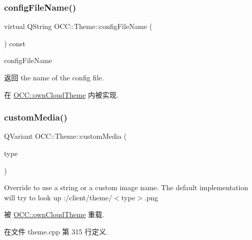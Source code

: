\subsubsection{\texorpdfstring{config\+File\+Name()}{configFileName()}}
{\footnotesize\ttfamily virtual Q\+String O\+C\+C\+::\+Theme\+::config\+File\+Name (\begin{DoxyParamCaption}{ }\end{DoxyParamCaption}) const\hspace{0.3cm}{\ttfamily [pure virtual]}}



config\+File\+Name 

\begin{DoxyReturn}{返回}
the name of the config file. 
\end{DoxyReturn}


在 \hyperlink{class_o_c_c_1_1own_cloud_theme_a83b4d95d9bc4fa972ad2e044720beac0}{O\+C\+C\+::own\+Cloud\+Theme} 内被实现.

\mbox{\label{class_o_c_c_1_1_theme_ac248812f511fad2b02d376b451bba2ec}} 
\subsubsection{\texorpdfstring{custom\+Media()}{customMedia()}}
{\footnotesize\ttfamily Q\+Variant O\+C\+C\+::\+Theme\+::custom\+Media (\begin{DoxyParamCaption}\item[{\hyperlink{class_o_c_c_1_1_theme_a7d36668d1fd0d715e4e1d8f4590d2d5d}{Custom\+Media\+Type}}]{type }\end{DoxyParamCaption})\hspace{0.3cm}{\ttfamily [virtual]}}

Override to use a string or a custom image name. The default implementation will try to look up \+:/client/theme/$<$type$>$.png 

被 \hyperlink{class_o_c_c_1_1own_cloud_theme_aa920f64294310b68e6ea50e1c2ec0d0b}{O\+C\+C\+::own\+Cloud\+Theme} 重载.



在文件 theme.\+cpp 第 315 行定义.

\mbox{\label{class_o_c_c_1_1_theme_a3f7be01351a7521147b1c9d287d7b9c4}} 
